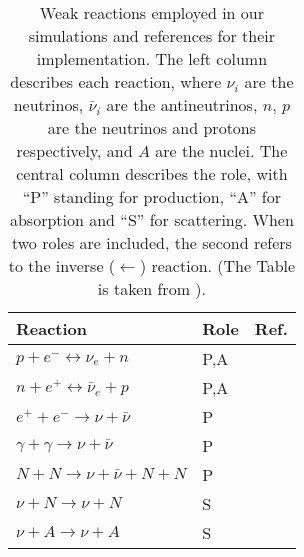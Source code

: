 \begin{table}
    \caption{
        Weak reactions employed in our simulations and references for their implementation.
        The left column describes each reaction, where $\nu_i$ are the 
        neutrinos, $\bar{\nu}_i$ are the antineutrinos, $n,\,p$ are the 
        neutrinos and protons respectively, and $A$ are the nuclei. 
        The central column describes the role, with ``P'' standing for 
        production, ``A'' for absorption and ``S'' for scattering. 
        When two roles are included, the second refers to the inverse ($\leftarrow$) reaction.
        (The Table is taken from \citet{Radice:2018pdn}).
    }
    \label{tab:leakage}
    \begin{center}
        \begin{tabular}{l l l}
            \hline\hline
            Reaction & Role &  Ref. \\ 
            \hline
            $p + e^- \leftrightarrow \nu_e + n $          & P,A & \citep{Bruenn:1985}  \\
            $n + e^+ \leftrightarrow \bar{\nu}_{e} + p $  & P,A & \citep{Bruenn:1985}  \\
            $e^+ + e^- \rightarrow \nu + \bar{\nu}$       & P   & \citep{Ruffert:1995fs} \\
            $\gamma + \gamma \rightarrow \nu + \bar{\nu}$ & P   & \citep{Ruffert:1995fs} \\
            $N + N \rightarrow \nu + \bar{\nu} + N  + N$  & P   & \citep{Burrows:2004vq} \\
            $\nu + N \rightarrow \nu + N$                 & S   & \citep{Ruffert:1995fs} \\
            $\nu + A \rightarrow \nu + A$                 & S   & \citep{Shapiro:1983du} \\
            \hline\hline
        \end{tabular}
    \end{center}
\end{table}

